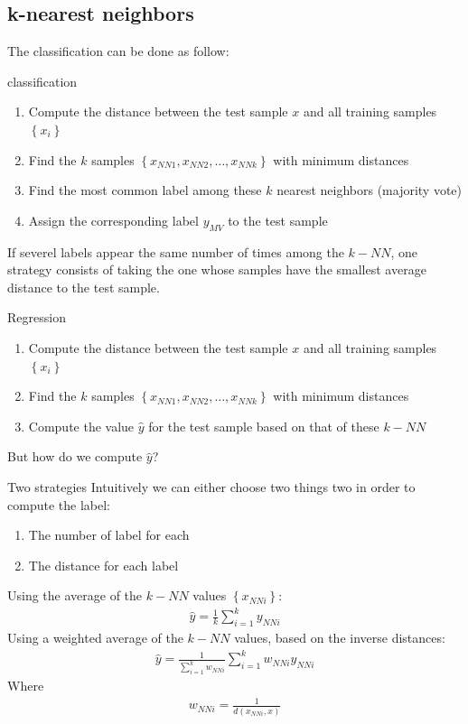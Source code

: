 \subsection{k-nearest neighbors}
The classification can be done as follow:
\begin{parag}{classification}

\begin{enumerate}
    \item Compute the distance between the test sample $x$ and all training samples $\left\{x_i\right\}$
    \item Find the $k$ samples $\left\{x_{NN1}, x_{NN2}, \ldots, x_{NNk}\right\}$ with minimum distances
    \item Find the most common label among these $k$ nearest neighbors (majority vote)
    \item Assign the corresponding label $y_{MV}$ to the test sample
\end{enumerate}
If severel labels appear the same number of times among the $k-NN$, one strategy consists of taking the one whose samples have the smallest average distance to the test sample.

\end{parag}
\begin{parag}{Regression}
    
\begin{enumerate}
    \item Compute the distance between the test sample $x$ and all training samples $\left\{x_i\right\}$
    \item Find the $k$ samples $\left\{x_{NN1}, x_{NN2}, \ldots, x_{NNk}\right\}$ with minimum distances
    \item Compute the value $\hat{y}$ for the test sample based on that of these $k-NN$
\end{enumerate}
	But how do we compute $\hat{y}$?
\end{parag}
\begin{parag}{Two strategies}
    Intuitively we can either choose two things two in order to compute the label:
	\begin{enumerate}
	    \item The number of label for each
	    \item The distance for each label
	\end{enumerate}
	Using the average of the $k-NN$ values $\left\{x_{NNi}\right\}$:
	\begin{align*} 
		\hat{y} = \frac{1}{k} \sum_{i= 1}^{k} y_{NNi}
	\end{align*}
	Using a weighted average of the $k-NN$ values, based on the inverse distances:
	\begin{align*} 
		\hat{y} = \frac{1}{\sum_{i= 1}^{k}w_{NNi}} \sum_{i= 1}^{k}w_{NNi}y_{NNi}
	\end{align*}
	Where
	\begin{align*} 
		w_{NNi} = \frac{1}{d\left(x_{NNi}, x\right)}
	\end{align*}
\end{parag}
